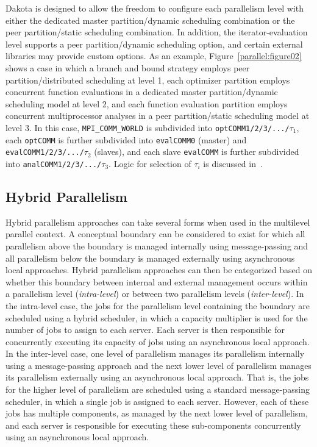 Dakota is designed to allow the freedom to configure each parallelism
level with either the dedicated master partition/dynamic scheduling
combination or the peer partition/static scheduling combination. In
addition, the iterator-evaluation level supports a peer partition/dynamic 
scheduling option, and certain external libraries may provide custom options.
As an
example, Figure~\ref{parallel:figure02} shows a case in which a branch
and bound strategy employs peer partition/distributed scheduling at
level 1, each optimizer partition employs concurrent function
evaluations in a dedicated master partition/dynamic scheduling model at
level 2, and each function evaluation partition employs concurrent
multiprocessor analyses in a peer partition/static scheduling model at
level 3. In this case, \texttt{MPI\_COMM\_WORLD} is subdivided into
\texttt{optCOMM1/2/3/.../$\tau_{1}$}, each \texttt{optCOMM} is further
subdivided into \texttt{evalCOMM0} (master) and
\texttt{evalCOMM1/2/3/.../$\tau_{2}$} (slaves), and each slave
\texttt{evalCOMM} is further subdivided into
\texttt{analCOMM1/2/3/.../$\tau_{3}$}.  Logic for selection of $\tau_i$
is discussed in~\cite{Eld00}.


\subsection{Hybrid Parallelism}\label{parallel:MLP:hybrid}

Hybrid parallelism approaches can take several forms when used in the
multilevel parallel context. A conceptual boundary can be considered
to exist for which all parallelism above the boundary is managed
internally using message-passing and all parallelism below the
boundary is managed externally using asynchronous local approaches.
Hybrid parallelism approaches can then be categorized based on whether
this boundary between internal and external management occurs within a
parallelism level (\emph{intra-level}) or between two parallelism
levels (\emph{inter-level}). In the intra-level case, the jobs for the
parallelism level containing the boundary are scheduled using a hybrid
scheduler, in which a capacity multiplier is used for the number of
jobs to assign to each server. Each server is then responsible for
concurrently executing its capacity of jobs using an asynchronous
local approach. In the inter-level case, one level of parallelism
manages its parallelism internally using a message-passing approach
and the next lower level of parallelism manages its parallelism
externally using an asynchronous local approach. That is, the jobs for
the higher level of parallelism are scheduled using a standard
message-passing scheduler, in which a single job is assigned to each
server. However, each of these jobs has multiple components, as
managed by the next lower level of parallelism, and each server is
responsible for executing these sub-components concurrently using an
asynchronous local approach.

